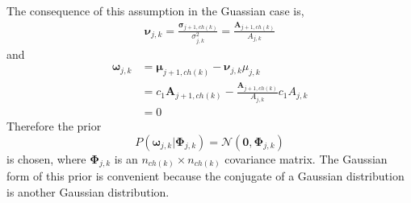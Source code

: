 \documentclass[a4paper,12pt]{article}
\theoremstyle{definition}
\begin{document}
The consequence of this assumption in the Guassian case is,
\begin{align*}
	\boldsymbol{\nu}_{j,k} = \frac{\boldsymbol{\sigma}_{j+1,ch(k)}}{\sigma_{j,k}^2} = \frac{\mathbf{A}_{j+1,ch(k)}}{A_{j,k}}
\end{align*}
and
\begin{align*}
	\boldsymbol{\omega}_{j,k} &= \boldsymbol{\mu}_{j+1, ch(k)} - \boldsymbol{\nu}_{j,k}\mu_{j,k} \\
		&= c_1 \mathbf{A}_{j+1,ch(k)} - \frac{\mathbf{A}_{j+1,ch(k)}}{A_{j,k}} c_1 A_{j,k} \\
		&= 0
\end{align*}
Therefore the prior
\begin{equation}\label{eq:gaussian_omega_prior}
	P(\boldsymbol{\omega}_{j,k} | \boldsymbol{\Phi}_{j,k}) = \mathcal{N}(\mathbf{0}, \boldsymbol{\Phi}_{j,k})
\end{equation}
is chosen, where $\boldsymbol{\Phi}_{j,k}$ is an $n_{ch(k)} \times n_{ch(k)}$ covariance matrix. The Gaussian form of this prior is convenient because the conjugate of a Gaussian distribution is another Gaussian distribution.
\end{document}
